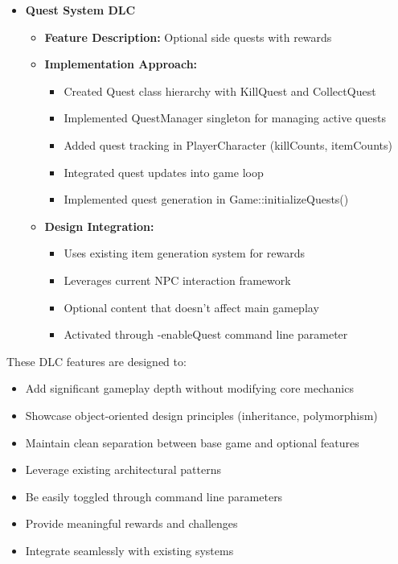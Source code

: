 \documentclass{article}
\begin{document}
\begin{itemize}
    \item \textbf{Quest System DLC}
    \begin{itemize}
        \item \textbf{Feature Description:} Optional side quests with rewards
        \item \textbf{Implementation Approach:}
        \begin{itemize}
            \item Created Quest class hierarchy with KillQuest and CollectQuest
            \item Implemented QuestManager singleton for managing active quests
            \item Added quest tracking in PlayerCharacter (killCounts, itemCounts)
            \item Integrated quest updates into game loop
            \item Implemented quest generation in Game::initializeQuests()
        \end{itemize}
        \item \textbf{Design Integration:}
        \begin{itemize}
            \item Uses existing item generation system for rewards
            \item Leverages current NPC interaction framework
            \item Optional content that doesn't affect main gameplay
            \item Activated through -enableQuest command line parameter
        \end{itemize}
    \end{itemize}
\end{itemize}

These DLC features are designed to:
\begin{itemize}
    \item Add significant gameplay depth without modifying core mechanics
    \item Showcase object-oriented design principles (inheritance, polymorphism)
    \item Maintain clean separation between base game and optional features
    \item Leverage existing architectural patterns
    \item Be easily toggled through command line parameters
    \item Provide meaningful rewards and challenges
    \item Integrate seamlessly with existing systems
\end{itemize}
\end{document}
